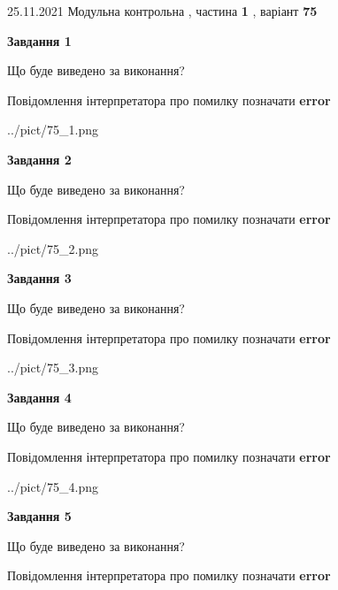 \documentclass[10pt, ukrainian]{article}
\begin{document}
{25.11.2021 Модульна контрольна , частина \textbf { 1 }, варіант  \No \textbf { 75 }\par}
{
\begin {large}

{\begin {center}\textbf{Завдання 1}\end {center}}\par
Що буде виведено за виконання? \par
Повідомлення інтерпретатора про помилку позначати \textbf{error}

\begin{center}
	{../pict/75_1.png}
\end{center}
\newpage

{\begin {center}\textbf{Завдання 2}\end {center}}\par
Що буде виведено за виконання? \par
Повідомлення інтерпретатора про помилку позначати \textbf{error}

\begin{center}
	{../pict/75_2.png}
\end{center}
\newpage

{\begin {center}\textbf{Завдання 3}\end {center}}\par
Що буде виведено за виконання? \par
Повідомлення інтерпретатора про помилку позначати \textbf{error}

\begin{center}
	{../pict/75_3.png}
\end{center}
\newpage

{\begin {center}\textbf{Завдання 4}\end {center}}\par
Що буде виведено за виконання? \par
Повідомлення інтерпретатора про помилку позначати \textbf{error}

\begin{center}
	{../pict/75_4.png}
\end{center}
\newpage

{\begin {center}\textbf{Завдання 5}\end {center}}\par
Що буде виведено за виконання? \par
Повідомлення інтерпретатора про помилку позначати \textbf{error}


\end{large}}
\end{document}
